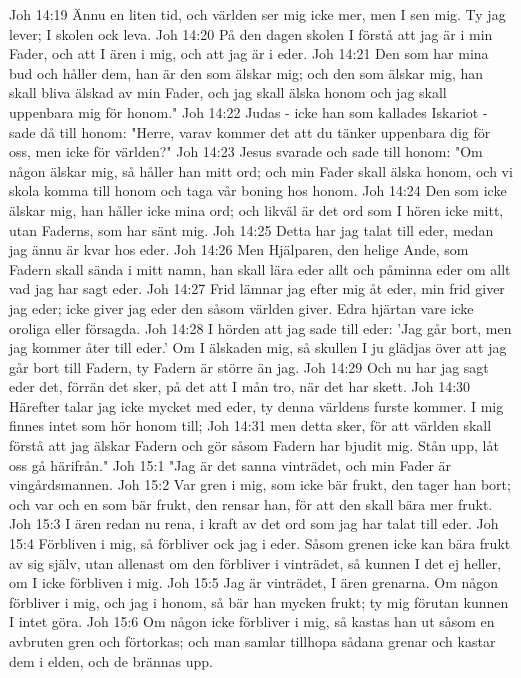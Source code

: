 Joh 14:19  Ännu en liten tid, och världen ser mig icke mer, men I sen mig. Ty jag lever; I skolen ock leva.
Joh 14:20  På den dagen skolen I förstå att jag är i min Fader, och att I ären i mig, och att jag är i eder.
Joh 14:21  Den som har mina bud och håller dem, han är den som älskar mig; och den som älskar mig, han skall bliva älskad av min Fader, och jag skall älska honom och jag skall uppenbara mig för honom."
Joh 14:22  Judas - icke han som kallades Iskariot - sade då till honom: "Herre, varav kommer det att du tänker uppenbara dig för oss, men icke för världen?"
Joh 14:23  Jesus svarade och sade till honom: "Om någon älskar mig, så håller han mitt ord; och min Fader skall älska honom, och vi skola komma till honom och taga vår boning hos honom.
Joh 14:24  Den som icke älskar mig, han håller icke mina ord; och likväl är det ord som I hören icke mitt, utan Faderns, som har sänt mig.
Joh 14:25  Detta har jag talat till eder, medan jag ännu är kvar hos eder.
Joh 14:26  Men Hjälparen, den helige Ande, som Fadern skall sända i mitt namn, han skall lära eder allt och påminna eder om allt vad jag har sagt eder.
Joh 14:27  Frid lämnar jag efter mig åt eder, min frid giver jag eder; icke giver jag eder den såsom världen giver. Edra hjärtan vare icke oroliga eller försagda.
Joh 14:28  I hörden att jag sade till eder: 'Jag går bort, men jag kommer åter till eder.' Om I älskaden mig, så skullen I ju glädjas över att jag går bort till Fadern, ty Fadern är större än jag.
Joh 14:29  Och nu har jag sagt eder det, förrän det sker, på det att I mån tro, när det har skett.
Joh 14:30  Härefter talar jag icke mycket med eder, ty denna världens furste kommer. I mig finnes intet som hör honom till;
Joh 14:31  men detta sker, för att världen skall förstå att jag älskar Fadern och gör såsom Fadern har bjudit mig. Stån upp, låt oss gå härifrån."
Joh 15:1  "Jag är det sanna vinträdet, och min Fader är vingårdsmannen.
Joh 15:2  Var gren i mig, som icke bär frukt, den tager han bort; och var och en som bär frukt, den rensar han, för att den skall bära mer frukt.
Joh 15:3  I ären redan nu rena, i kraft av det ord som jag har talat till eder.
Joh 15:4  Förbliven i mig, så förbliver ock jag i eder. Såsom grenen icke kan bära frukt av sig själv, utan allenast om den förbliver i vinträdet, så kunnen I det ej heller, om I icke förbliven i mig.
Joh 15:5  Jag är vinträdet, I ären grenarna. Om någon förbliver i mig, och jag i honom, så bär han mycken frukt; ty mig förutan kunnen I intet göra.
Joh 15:6  Om någon icke förbliver i mig, så kastas han ut såsom en avbruten gren och förtorkas; och man samlar tillhopa sådana grenar och kastar dem i elden, och de brännas upp.
